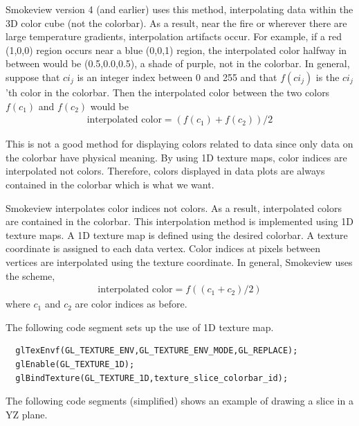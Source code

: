 \documentclass[11pt,twoside]{book}
\begin{document}
Smokeview version 4 (and earlier) uses this method, interpolating
data within the 3D color cube (not the colorbar).  As a result,
near the fire or wherever there are large temperature gradients,
interpolation artifacts occur.  For example, if a red (1,0,0)
region occurs near a blue (0,0,1) region, the interpolated color
halfway in between would be (0.5,0.0,0.5), a shade of purple, not
in the colorbar.  In general, suppose that $ci_j$ is an integer
index between 0 and 255 and that $f(ci_j)$ is the $ci_j$'th color
in the colorbar.  Then the interpolated color between the
two colors $f(c_1)$ and $f(c_2)$ would be
\begin{eqnarray}
\mbox{interpolated color}=(f(c_1)+f(c_2))/2
\end{eqnarray}

This is not a good method for displaying colors related to data
since only data on the colorbar have physical meaning.  By using
1D texture maps, color indices are interpolated not colors.
Therefore, colors displayed in data plots are always contained in
the colorbar which is what we want.

Smokeview interpolates color indices not colors. As a result,
interpolated colors are contained in the colorbar.  This
interpolation method is implemented using 1D texture maps.  A 1D
texture map is defined using the desired colorbar.  A texture
coordinate is assigned to each data vertex.    Color indices at
pixels between vertices are interpolated using the texture
coordinate.  In general, Smokeview uses the scheme,
\begin{eqnarray}
\mbox{interpolated color}=f((c_1+c_2)/2)
\end{eqnarray}
where $c_1$ and $c_2$ are color indices as before.

The following code segment sets up the use of 1D texture map.

\begin{lstlisting}
  glTexEnvf(GL_TEXTURE_ENV,GL_TEXTURE_ENV_MODE,GL_REPLACE);
  glEnable(GL_TEXTURE_1D);
  glBindTexture(GL_TEXTURE_1D,texture_slice_colorbar_id);
\end{lstlisting}

The following code segments (simplified) shows an example of drawing a slice in a YZ plane.
\end{document}
